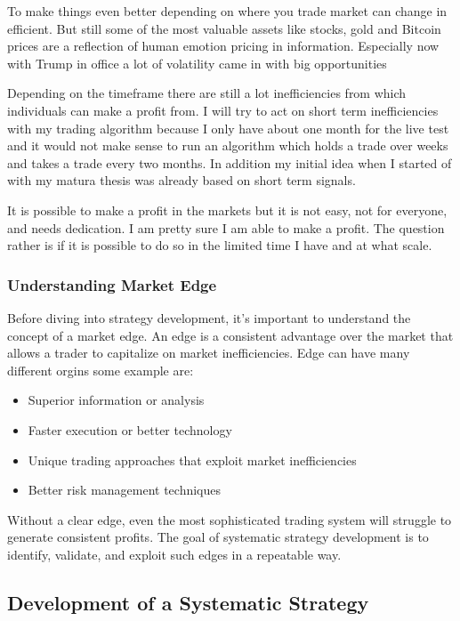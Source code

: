 \documentclass[12pt]{article}
\begin{document}
To make things even better depending on where you trade market can change in efficient. But still some of the most valuable assets like stocks, gold and Bitcoin prices are a reflection of human emotion pricing in information. Especially now with Trump in office a lot of volatility came in with big opportunities

Depending on the timeframe there are still a lot inefficiencies from which individuals can make a profit from. I will try to act on short term inefficiencies with my trading algorithm because I only have about one month for the live test and it would not make sense to run an algorithm which holds a trade over weeks and takes a trade every two months. In addition my initial idea when I started of with my matura thesis was already based on short term signals.

It is possible to make a profit in the markets but it is not easy, not for everyone, and needs dedication. I am pretty sure I am able to make a profit. The question rather is if it is possible to do so in the limited time I have and at what scale.






\subsubsection*{Understanding Market Edge}
Before diving into strategy development, it's important to understand the concept of a market edge. An edge is a consistent advantage over the market that allows a trader to capitalize on market inefficiencies. Edge can have many different orgins some example are:
\begin{itemize}
    \item Superior information or analysis
    \item Faster execution or better technology
    \item Unique trading approaches that exploit market inefficiencies
    \item Better risk management techniques
\end{itemize}
Without a clear edge, even the most sophisticated trading system will struggle to generate consistent profits. The goal of systematic strategy development is to identify, validate, and exploit such edges in a repeatable way.








\subsection{Development of a Systematic Strategy}
\end{document}
